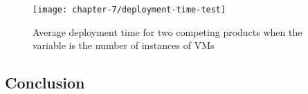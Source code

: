 \begin{figure}[!ht]
  \begin{center}
    \texttt{[image: chapter-7/deployment-time-test]}
  \end{center}
  \caption{Average deployment time for two competing products when the variable is the number of instances of VMs}
  \label{ch7:deployment-time-test}
\end{figure}

\subsection*{Conclusion}

